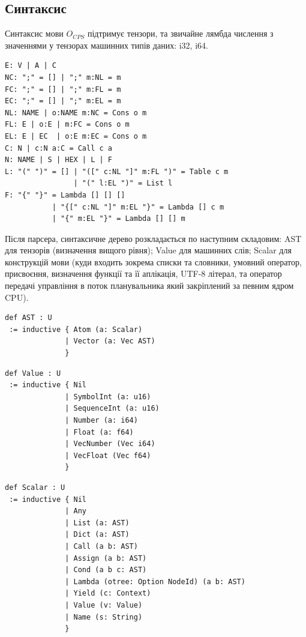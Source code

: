 \documentclass{article}
\begin{document}
\newpage
\subsection{Синтаксис}
Синтаксис мови $O_{CPS}$ підтримує тензори, та звичайне лямбда числення
з значеннями у тензорах машинних типів даних: i32, i64.

\begin{lstlisting}[mathescape=true]
E: V | A | C
NC: ";" = [] | ";" m:NL = m
FC: ";" = [] | ";" m:FL = m
EC: ";" = [] | ";" m:EL = m
NL: NAME | o:NAME m:NC = Cons o m
FL: E | o:E | m:FC = Cons o m
EL: E | EC  | o:E m:EC = Cons o m
C: N | c:N a:C = Call c a
N: NAME | S | HEX | L | F
L: "(" ")" = [] | "([" c:NL "]" m:FL ")" = Table c m
                | "(" l:EL ")" = List l
F: "{" "}" = Lambda [] [] []
           | "{[" c:NL "]" m:EL "}" = Lambda [] c m
           | "{" m:EL "}" = Lambda [] [] m
\end{lstlisting}

Після парсера, синтаксичне дерево розкладається по наступним складовим: AST для
тензорів (визначення вищого рівня); Value для машинних слів; Scalar для
конструкцій мови (куди входить зокрема списки та словники, умовний оператор,
присвоєння, визначення функції та її аплікація, UTF-8 літерал, та оператор
передачі управління в поток планувальника який закріплений за певним ядром CPU).

\begin{lstlisting}
def AST : U
 := inductive { Atom (a: Scalar)
              | Vector (a: Vec AST)
              }
\end{lstlisting}

\begin{lstlisting}
def Value : U
 := inductive { Nil
              | SymbolInt (a: u16)
              | SequenceInt (a: u16)
              | Number (a: i64)
              | Float (a: f64)
              | VecNumber (Vec i64)
              | VecFloat (Vec f64)
              }
\end{lstlisting}

\newpage
\begin{lstlisting}
def Scalar : U
 := inductive { Nil
              | Any
              | List (a: AST)
              | Dict (a: AST)
              | Call (a b: AST)
              | Assign (a b: AST)
              | Cond (a b c: AST)
              | Lambda (otree: Option NodeId) (a b: AST)
              | Yield (c: Context)
              | Value (v: Value)
              | Name (s: String)
              }
\end{lstlisting}
\end{document}
